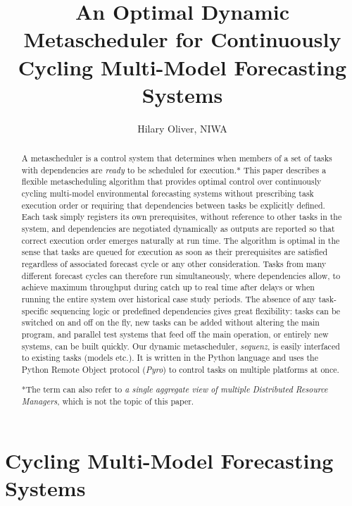 \documentclass[11pt,a4paper]{article}
\title{An Optimal Dynamic Metascheduler for Continuously Cycling
Multi-Model Forecasting Systems}
\author{Hilary Oliver, NIWA}
\begin{document}
\maketitle

\begin{abstract} A metascheduler is a control system that determines
    when members of a set of tasks with dependencies are {\em ready} to
    be scheduled for execution.* This paper describes a flexible
    metascheduling algorithm that provides optimal control over
    continuously cycling multi-model environmental forecasting systems
    without prescribing task execution order or requiring that
    dependencies between tasks be explicitly defined. Each task simply
    registers its own prerequisites, without reference to other tasks in
    the system, and dependencies are negotiated dynamically as outputs
    are reported so that correct execution order emerges naturally at
    run time.  The algorithm is optimal in the sense that tasks are
    queued for execution as soon as their prerequisites are
    satisfied regardless of associated forecast cycle or any other
    consideration. Tasks from many different forecast cycles can
    therefore run simultaneously, where dependencies allow, to achieve
    maximum throughput during catch up to real time after delays or when
    running the entire system over historical case study periods. The
    absence of any task-specific sequencing logic or predefined
    dependencies gives great flexibility: tasks can be switched on and
    off on the fly, new tasks can be added without altering the main
    program, and parallel test systems that feed off the main operation,
    or entirely new systems, can be built quickly.  Our dynamic
    metascheduler, {\em sequenz}, is easily interfaced to existing tasks
    (models etc.). It is written in the Python language and uses the
    Python Remote Object protocol ({\em Pyro}) to control tasks on
    multiple platforms at once. 

*The term can also refer to {\it a single aggregate view of multiple
Distributed Resource Managers}, which is not the topic of this paper.

\end{abstract}

\pagebreak
\tableofcontents
\pagebreak

\section{Cycling Multi-Model Forecasting Systems}
\end{document}
